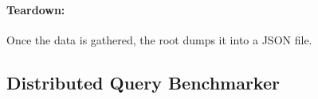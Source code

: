 \paragraph{Teardown:}
Once the data is gathered, the root dumps it into a \ac{JSON} file.

\subsection{Distributed Query Benchmarker}
